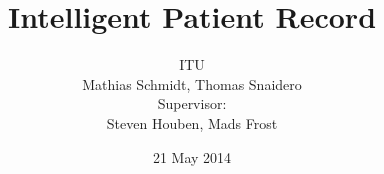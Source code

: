 \documentclass{article}
\title{Intelligent Patient Record}
\author{ITU \\
Mathias Schmidt, Thomas Snaidero \\
Supervisor: \\
Steven Houben, Mads Frost}
\date{21 May 2014}
\begin{document}
\maketitle

\pagebreak

\tableofcontents

\pagebreak
















% 

% 

% 
\end{document}
